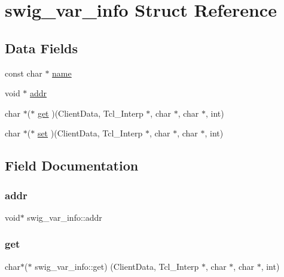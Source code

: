\hypertarget{structswig__var__info}{}\section{swig\+\_\+var\+\_\+info Struct Reference}
\label{structswig__var__info}
\subsection*{Data Fields}
\begin{DoxyCompactItemize}
\item 
const char $\ast$ \hyperlink{structswig__var__info_a818f171973e6e1135a46b8b918c0b9eb}{name}
\item 
void $\ast$ \hyperlink{structswig__var__info_a8aefe7e94367ddbab2d090d913232b4f}{addr}
\item 
char $\ast$($\ast$ \hyperlink{structswig__var__info_a2077b465ca9dbaa90d7ca67eae508bf2}{get} )(Client\+Data, Tcl\+\_\+\+Interp $\ast$, char $\ast$, char $\ast$, int)
\item 
char $\ast$($\ast$ \hyperlink{structswig__var__info_a1c988d1806abe81050d325cc12524608}{set} )(Client\+Data, Tcl\+\_\+\+Interp $\ast$, char $\ast$, char $\ast$, int)
\end{DoxyCompactItemize}


\subsection{Field Documentation}
\mbox{\label{structswig__var__info_a8aefe7e94367ddbab2d090d913232b4f}} 
\subsubsection{\texorpdfstring{addr}{addr}}
{\footnotesize\ttfamily void$\ast$ swig\+\_\+var\+\_\+info\+::addr}

\mbox{\label{structswig__var__info_a2077b465ca9dbaa90d7ca67eae508bf2}} 
\subsubsection{\texorpdfstring{get}{get}}
{\footnotesize\ttfamily char$\ast$($\ast$ swig\+\_\+var\+\_\+info\+::get) (Client\+Data, Tcl\+\_\+\+Interp $\ast$, char $\ast$, char $\ast$, int)}

